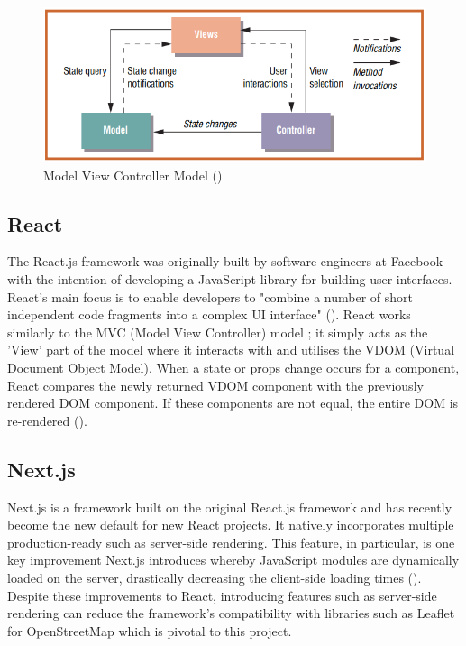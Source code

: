 \begin{figure}
    \centering
    \includegraphics[width=0.9\linewidth]{figures/MVC.png}
    \caption{Model View Controller Model (\cite{curry_flexible_2008})}
    \label{fig:mvc-model}
\end{figure}

\clearpage

\subsection{React} 
\label{litrev:react}

The React.js framework was originally built by software engineers at Facebook with the intention of developing a JavaScript library for building user interfaces. React's main focus is to enable developers to "combine a number of short independent code fragments into a complex UI interface" (\cite{xu_benchmark_nodate}). React works similarly to the MVC (Model View Controller) model ; it simply acts as the 'View' part of the model where it interacts with and utilises the VDOM (Virtual Document Object Model). When a state or props change occurs for a component, React compares the newly returned VDOM component with the previously rendered DOM component. If these components are not equal, the entire DOM is re-rendered (\cite{mariano_benchmarking_nodate}). 

\subsection{Next.js}
\label{litrev:next}

Next.js is a framework built on the original React.js framework and has recently become the new default for new React projects. It natively incorporates multiple production-ready such as server-side rendering. This feature, in particular, is one key improvement Next.js introduces whereby JavaScript modules are dynamically loaded on the server, drastically decreasing the client-side loading times (\cite{dinku_reactjs_2022}). Despite these improvements to React, introducing features such as server-side rendering can reduce the framework's compatibility with libraries such as Leaflet for OpenStreetMap which is pivotal to this project.

